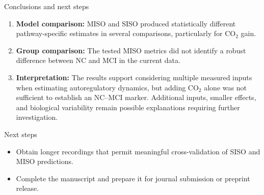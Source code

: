 \documentclass[aspectratio=169,11pt]{beamer}
\begin{document}
\begin{frame}{Conclusions and next steps}
    \begin{enumerate}
        \item \textbf{Model comparison:} MISO and SISO produced statistically
        different pathway-specific estimates in several comparisons,
        particularly for CO$_2$ gain.

        \item \textbf{Group comparison:} The tested MISO metrics did not
        identify a robust difference between NC and MCI in the current data.

        \item \textbf{Interpretation:} The results support considering
        multiple measured inputs when estimating autoregulatory dynamics, but
        adding CO$_2$ alone was not sufficient to establish an NC--MCI marker.
        Additional inputs, smaller effects, and biological variability remain
        possible explanations requiring further investigation.
    \end{enumerate}

    \vspace{0.25cm}
    \begin{alertblock}{Next steps}
        \begin{itemize}
            \item Obtain longer recordings that permit meaningful
            cross-validation of SISO and MISO predictions.
            \item Complete the manuscript and prepare it for journal
            submission or preprint release.
        \end{itemize}
    \end{alertblock}

\end{frame}


\appendix
\end{document}

